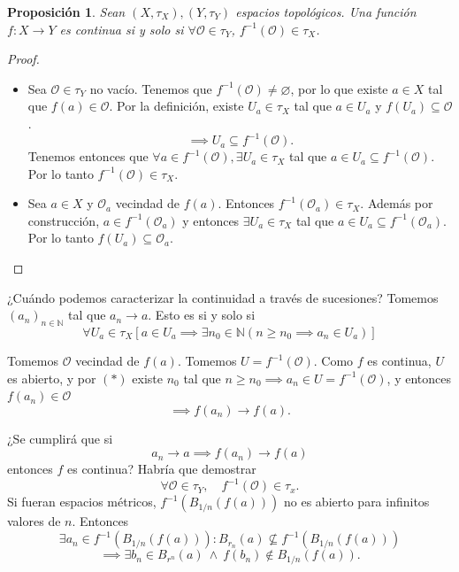 \documentclass{article}
\newtheorem{proposition}[theorem]{Proposición}
\theoremstyle{definition}
\theoremstyle{remark}
\numberwithin{equation}{section}
\newcommand{\N}{\mathbb{N}}
\renewcommand{\O}{\mathcal{O}}
\renewcommand{\t}{\tau}
\begin{document}
\begin{proposition}
  Sean $(X,\t_X), (Y,\t_Y)$ espacios topológicos. Una función $f \colon X \to Y$ es continua si y solo si $\forall \O \in \t_Y$, $f^{-1}(\O) \in \t_X$.
\end{proposition}
\begin{proof}
  \
  \begin{itemize}
    \item [\boxed{\implies}]
    Sea $\O \in \t_Y$ no vacío. Tenemos que $f^{-1}(\O) \neq \varnothing$, por lo que existe $a \in X$ tal que $f(a) \in \O$.
    Por la definición, existe $U_a \in \t_X$ tal que $a \in U_a$ y $f(U_a) \subseteq \O$. $$\implies U_a \subseteq f^{-1}(\O).$$
    Tenemos entonces que $\forall a \in f^{-1}(\O), \exists U_a \in \t_X$ tal que $a \in U_a \subseteq f^{-1}(\O)$. Por lo tanto $f^{-1}(\O) \in \t_X$.

    \item [\boxed{\impliedby}]
    Sea $a \in X$ y $\O_a$ vecindad de $f(a)$. Entonces $f^{-1}(\O_a) \in \t_X$. Además por construcción, $a \in f^{-1}(\O_a)$ y entonces $\exists U_a \in \t_X$ tal que $a \in U_a \subseteq f^{-1}(\O_a)$. Por lo tanto $f(U_a) \subseteq \O_a$.
  \end{itemize}
\end{proof}

¿Cuándo podemos caracterizar la continuidad a través de sucesiones?
Tomemos $(a_n)_{n\in\N}$ tal que $a_n \to a$. Esto es si y solo si
\[\tag{$*$}
\forall U_a \in \t_X [a \in U_a \implies \exists n_0 \in \N (n \geq n_0 \implies a_n \in U_a)]
\]


Tomemos $\O$ vecindad de $f(a)$. Tomemos $U = f^{-1}(\O)$. Como $f$ es continua, $U$ es abierto, y por $(*)$ existe $n_0$ tal que $n \geq n_0 \implies a_n \in U = f^{-1}(\O)$, y entonces $f(a_n) \in \O$
$$\implies f(a_n) \to f(a).$$

¿Se cumplirá que si $$a_n \to a \implies f(a_n) \to f(a)$$ entonces $f$ es continua?
Habría que demostrar
\[\tag{$**$}
\forall \O \in \t_Y, \quad f^{-1}(\O) \in \t_x.
\]
Si fueran espacios métricos, $f^{-1}(B_{1/n}(f(a)))$ no es abierto para infinitos valores de $n$.
Entonces
\[\exists a_n \in f^{-1}(B_{1/n}(f(a))) \colon B_{r_n}(a) \not\subseteq f^{-1}(B_{1/n}(f(a)))\]
\[\implies \exists b_n \in B_{r^n}(a) \ \land \ f(b_n) \notin B_{1/n}(f(a)).\]
\end{document}
